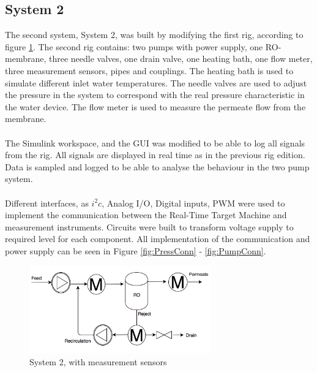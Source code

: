 \subsection{System 2}
The second system, System 2, was built by modifying the first rig, according to figure \ref{fig:MeasSys2}. The second rig contains: two pumps with power supply, one RO-membrane, three needle valves, one drain valve, one heating bath, one flow meter, three measurement sensors, pipes and couplings. The heating bath is used to simulate different inlet water temperatures. The needle valves are used to adjust the pressure in the system to correspond with the real pressure characteristic in the water device. The flow meter is used to measure the permeate flow from the membrane. \\
\\
The Simulink workspace, and the GUI was modified to be able to log all signals from the rig. All signals are displayed in real time as in the previous rig edition. Data is sampled and logged to be able to analyse the behaviour in the two pump system.  \\
\\
Different interfaces, as $i^{2}c$, Analog I/O, Digital inputs, PWM were used to implement the communication between the Real-Time Target Machine and measurement instruments. Circuits were built to transform voltage supply to required level for each component. All implementation of the communication and power supply can be seen in Figure \ref{fig:PressConn} - \ref{fig:PumpConn}. 

\begin{figure}[H]
    \centering
    \includegraphics[width=0.7\textwidth]{MeasSys2}
    \caption{System 2, with measurement sensors}
    \label{fig:MeasSys2}
\end{figure}

\newpage

